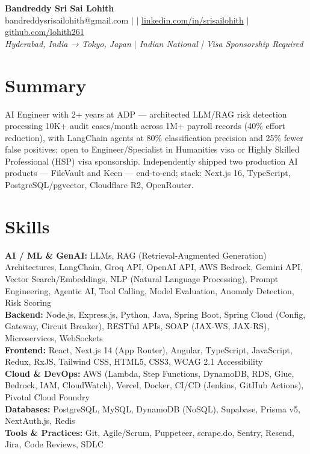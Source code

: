 \documentclass[10pt,letterpaper]{article}
\newcommand{\skillrow}[2]{\textbf{#1:} #2 \\[1pt]}
\begin{document}
\begin{center}
  {\Huge\bfseries Bandreddy Sri Sai Lohith}\\[3pt]
  \small bandreddysrisailohith@gmail.com $\vert$ $\vert$\; \href{https://linkedin.com/in/srisailohith}{linkedin.com/in/srisailohith} $\vert$\; \href{https://github.com/lohith261}{github.com/lohith261} \\[2pt]
  \small\textit{Hyderabad, India → Tokyo, Japan $\vert$\; Indian National | Visa Sponsorship Required}
\end{center}

\section{Summary}

AI Engineer with 2+ years at ADP --- architected LLM/RAG risk detection processing 10K+ audit cases/month across 1M+ payroll records (40\% effort reduction), with LangChain agents at 80\% classification precision and 25\% fewer false positives; open to Engineer/Specialist in Humanities visa or Highly Skilled Professional (HSP) visa sponsorship.
      Independently shipped two production AI products --- FileVault and Keen --- end-to-end; stack: Next.js 16, TypeScript, PostgreSQL/pgvector, Cloudflare R2, OpenRouter.

\section{Skills}

\skillrow{AI / ML \& GenAI}{LLMs, RAG (Retrieval-Augmented Generation) Architectures, LangChain, Groq API, OpenAI API, AWS Bedrock, Gemini API, Vector Search/Embeddings, NLP (Natural Language Processing), Prompt Engineering, Agentic AI, Tool Calling, Model Evaluation, Anomaly Detection, Risk Scoring}
\skillrow{Backend}{Node.js, Express.js, Python, Java, Spring Boot, Spring Cloud (Config, Gateway, Circuit Breaker), RESTful APIs, SOAP (JAX-WS, JAX-RS), Microservices, WebSockets}
\skillrow{Frontend}{React, Next.js 14 (App Router), Angular, TypeScript, JavaScript, Redux, RxJS, Tailwind CSS, HTML5, CSS3, WCAG 2.1 Accessibility}
\skillrow{Cloud \& DevOps}{AWS (Lambda, Step Functions, DynamoDB, RDS, Glue, Bedrock, IAM, CloudWatch), Vercel, Docker, CI/CD (Jenkins, GitHub Actions), Pivotal Cloud Foundry}
\skillrow{Databases}{PostgreSQL, MySQL, DynamoDB (NoSQL), Supabase, Prisma v5, NextAuth.js, Redis}
\skillrow{Tools \& Practices}{Git, Agile/Scrum, Puppeteer, scrape.do, Sentry, Resend, Jira, Code Reviews, SDLC}
\end{document}
